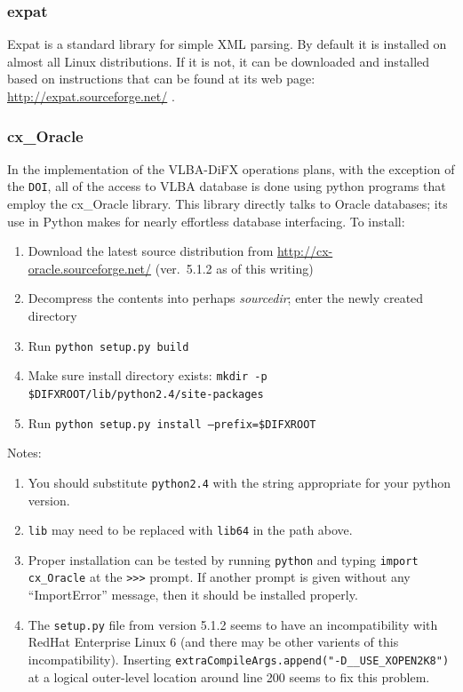 
\subsubsection{expat} \label{sec:expat}

Expat is a standard library for simple XML parsing.
By default it is installed on almost all Linux distributions.
If it is not, it can be downloaded and installed based on instructions that can be found at its web page:
\url{http://expat.sourceforge.net/} .









\subsubsection{cx\_Oracle} \label{sec:cxOracle}

In the implementation of the VLBA-DiFX operations plans, with the exception of the {\tt DOI}, all of the access to VLBA database is done using python programs that employ the cx\_Oracle library.
This library directly talks to Oracle databases; its use in Python makes for nearly effortless database interfacing.
To install:
\begin{enumerate}
\item Download the latest source distribution from \url{http://cx-oracle.sourceforge.net/} (ver.\ 5.1.2 as of this writing)
\item Decompress the contents into perhaps {\em sourcedir}; enter the newly created directory
\item Run {\tt python setup.py build}
\item Make sure install directory exists:  {\tt mkdir -p \$DIFXROOT/lib/python2.4/site-packages}
\item Run {\tt python setup.py install --prefix=\$DIFXROOT}
\end{enumerate}

\noindent
Notes:
\begin{enumerate}
\item You should substitute {\tt python2.4} with the string appropriate for your python version.
\item {\tt lib} may need to be replaced with {\tt lib64} in the path above.
\item Proper installation can be tested by running {\tt python} and typing {\tt import cx\_Oracle} at the {\tt >>>} prompt.
If another prompt is given without any ``ImportError'' message, then it should be installed properly.
\item The {\tt setup.py} file from version 5.1.2 seems to have an incompatibility with RedHat Enterprise Linux 6 (and there may be other varients of this incompatibility).
Inserting {\tt extraCompileArgs.append("-D\_\_USE\_XOPEN2K8")} at a logical outer-level location around line 200 seems to fix this problem.
\end{enumerate}






